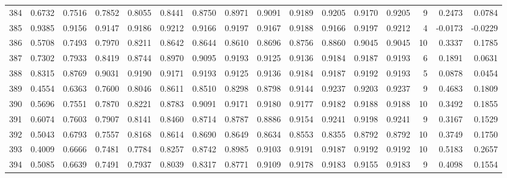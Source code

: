 \begin{tabular}{lrrrrrrrrrrrrrrr}
384 &      0.6732 &  0.7516 &  0.7852 &  0.8055 &  0.8441 &  0.8750 &  0.8971 &  0.9091 &  0.9189 &  0.9205 &   0.9170 &     0.9205 &      9 &                    0.2473 &                     0.0784 \\
385 &      0.9385 &  0.9156 &  0.9147 &  0.9186 &  0.9212 &  0.9166 &  0.9197 &  0.9167 &  0.9188 &  0.9166 &   0.9197 &     0.9212 &      4 &                   -0.0173 &                    -0.0229 \\
386 &      0.5708 &  0.7493 &  0.7970 &  0.8211 &  0.8642 &  0.8644 &  0.8610 &  0.8696 &  0.8756 &  0.8860 &   0.9045 &     0.9045 &     10 &                    0.3337 &                     0.1785 \\
387 &      0.7302 &  0.7933 &  0.8419 &  0.8744 &  0.8970 &  0.9095 &  0.9193 &  0.9125 &  0.9136 &  0.9184 &   0.9187 &     0.9193 &      6 &                    0.1891 &                     0.0631 \\
388 &      0.8315 &  0.8769 &  0.9031 &  0.9190 &  0.9171 &  0.9193 &  0.9125 &  0.9136 &  0.9184 &  0.9187 &   0.9192 &     0.9193 &      5 &                    0.0878 &                     0.0454 \\
389 &      0.4554 &  0.6363 &  0.7600 &  0.8046 &  0.8611 &  0.8510 &  0.8298 &  0.8798 &  0.9144 &  0.9237 &   0.9203 &     0.9237 &      9 &                    0.4683 &                     0.1809 \\
390 &      0.5696 &  0.7551 &  0.7870 &  0.8221 &  0.8783 &  0.9091 &  0.9171 &  0.9180 &  0.9177 &  0.9182 &   0.9188 &     0.9188 &     10 &                    0.3492 &                     0.1855 \\
391 &      0.6074 &  0.7603 &  0.7907 &  0.8141 &  0.8460 &  0.8714 &  0.8787 &  0.8886 &  0.9154 &  0.9241 &   0.9198 &     0.9241 &      9 &                    0.3167 &                     0.1529 \\
392 &      0.5043 &  0.6793 &  0.7557 &  0.8168 &  0.8614 &  0.8690 &  0.8649 &  0.8634 &  0.8553 &  0.8355 &   0.8792 &     0.8792 &     10 &                    0.3749 &                     0.1750 \\
393 &      0.4009 &  0.6666 &  0.7481 &  0.7784 &  0.8257 &  0.8742 &  0.8985 &  0.9103 &  0.9191 &  0.9187 &   0.9192 &     0.9192 &     10 &                    0.5183 &                     0.2657 \\
394 &      0.5085 &  0.6639 &  0.7491 &  0.7937 &  0.8039 &  0.8317 &  0.8771 &  0.9109 &  0.9178 &  0.9183 &   0.9155 &     0.9183 &      9 &                    0.4098 &                     0.1554 \\

\end{tabular}
